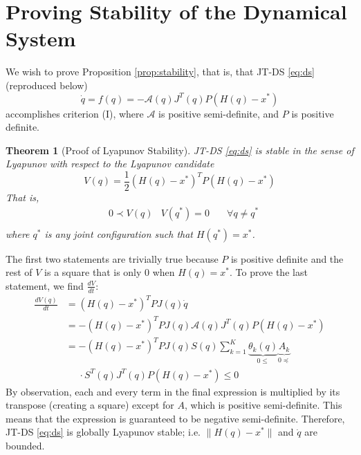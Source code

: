 \documentclass[letterpaper, 10 pt, conference,fleqn]{ieeeconf}
\begin{document}
\section{Proving Stability of the Dynamical System}
\label{appendix:stability}
We wish to prove Proposition \ref{prop:stability}, that is, that JT-DS \eqref{eq:ds} (reproduced below)
\begin{equation*}
\dot{q} = f(q) = -\mathcal{A}(q)J^T(q)P(H(q) - x^*)
\end{equation*}
accomplishes criterion (I), where $\mathcal{A}$ is positive semi-definite, and $P$ is positive definite.
\newtheorem{theorem}{Theorem}[section]
\begin{theorem}[Proof of Lyapunov Stability]
JT-DS \eqref{eq:ds} is stable in the sense of Lyapunov with respect to the Lyapunov candidate
\[ V(q) = \frac{1}{2}(H(q) - x^*)^TP(H(q) - x^*) \]
That is, 
\begin{equation}
\begin{aligned}
& 0 \prec V(q)    &
V(q^*) = 0 & \quad \forall q \neq q^*\\
\end{aligned}
\end{equation}
where $q^*$ is any joint configuration such that $H(q^*) = x^*$.
\end{theorem}
The first two statements are trivially true because $P$ is positive definite and the rest of $V$ is a square that is only $0$ when $H(q) = x^*$. To prove the last statement, we find $\frac{dV}{dt}$:
\begin{equation}
\begin{aligned}
\frac{dV(q)}{dt} &= (H(q) - x^*)^TPJ(q)\dot{q}\\
&= -(H(q) - x^*)^TPJ(q)\mathcal{A}(q)J^T(q)P(H(q) - x^*)\\
&= -(H(q) - x^*)^TPJ(q)S(q) \sum_{k=1}^{K}\underbrace{\theta_k(q)}_{0\leq}\underbrace{A_k}_{0\preceq}\\&~~~~~~ \cdot S^T(q)J^T(q)P(H(q) - x^*) \leq 0
\end{aligned}
\end{equation}
By observation, each and every term in the final expression is multiplied by its transpose (creating a square) except for $A$, which is positive semi-definite. This means that the expression is guaranteed to be negative semi-definite. Therefore, JT-DS \eqref{eq:ds} is globally Lyapunov stable; i.e. $ \| H(q)-x^*\| $ and $ \dot{q} $ are bounded. 
\end{document}
